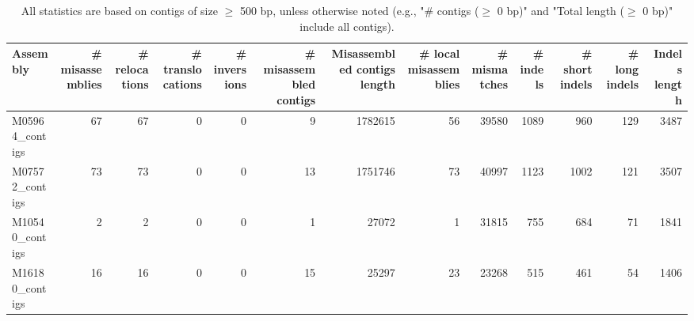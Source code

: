 \documentclass[12pt,a4paper]{article}
\begin{document}
\begin{table}[ht]
\begin{center}
\caption{All statistics are based on contigs of size $\geq$ 500 bp, unless otherwise noted (e.g., "\# contigs ($\geq$ 0 bp)" and "Total length ($\geq$ 0 bp)" include all contigs).}
\begin{tabular}{|l*{12}{|r}|}
\hline
Assembly & \# misassemblies &     \# relocations &     \# translocations &     \# inversions & \# misassembled contigs & Misassembled contigs length & \# local misassemblies & \# mismatches & \# indels &     \# short indels &     \# long indels & Indels length \\ \hline
M05964\_contigs & 67 & 67 & 0 & 0 & 9 & 1782615 & 56 & 39580 & 1089 & 960 & 129 & 3487 \\ \hline
M07572\_contigs & 73 & 73 & 0 & 0 & 13 & 1751746 & 73 & 40997 & 1123 & 1002 & 121 & 3507 \\ \hline
M10540\_contigs & 2 & 2 & 0 & 0 & 1 & 27072 & 1 & 31815 & 755 & 684 & 71 & 1841 \\ \hline
M16180\_contigs & 16 & 16 & 0 & 0 & 15 & 25297 & 23 & 23268 & 515 & 461 & 54 & 1406 \\ \hline
\end{tabular}
\end{center}
\end{table}
\end{document}
